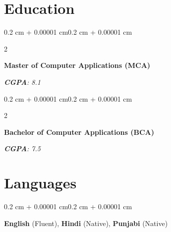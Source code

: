 \documentclass[10pt, a4paper]{article}
\newenvironment{onecolentry}{
    \begin{adjustwidth}{0.2 cm + 0.00001 cm}{0.2 cm + 0.00001 cm}
}{
    \end{adjustwidth}
}
\newenvironment{twocolentry}[2][]{
    \onecolentry
    \def\secondColumn{#2}
    \setcolumnwidth{\fill, 4.5 cm}
    \begin{paracol}{2}
}{
    \switchcolumn \raggedleft \secondColumn
    \end{paracol}
    \endonecolentry
}
\begin{document}
\section{Education}
\begin{twocolentry}{\textit{\textbf{CGPA}: 8.1}}
    \textbf{Master of Computer Applications (MCA)} 
\end{twocolentry}
\vspace{0.04 cm}
\begin{twocolentry}{\textit{\textbf{CGPA}: 7.5}}
    \textbf{Bachelor of Computer Applications (BCA)} 
\end{twocolentry}

\section{Languages}
\begin{onecolentry}
\textbf{English} (Fluent), \textbf{Hindi} (Native), \textbf{Punjabi} (Native)
\end{onecolentry}
\end{document}
